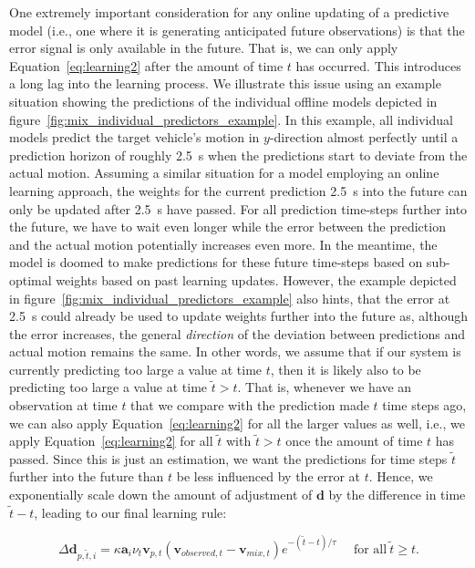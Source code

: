 One extremely important consideration for any online updating of a predictive model (i.e., one where it is generating anticipated future observations) is that the error signal is only available in the future.
That is, we can only apply Equation~\eqref{eq:learning2} after the amount of time $t$ has occurred.  
This introduces a long lag into the learning process.  
We illustrate this issue using an example situation showing the predictions of the individual offline models depicted in figure~\ref{fig:mix_individual_predictors_example}.
In this example, all individual models predict the target vehicle's motion in $y$-direction almost perfectly until a prediction horizon of roughly \SI{2.5}{\second} when the predictions start to deviate from the actual motion.
Assuming a similar situation for a model employing an online learning approach, the weights for the current prediction \SI{2.5}{\second} into the future can only be updated after \SI{2.5}{\second} have passed. 
For all prediction time-steps further into the future, we have to wait even longer while the error between the prediction and the actual motion potentially increases even more.
In the meantime, the model is doomed to make predictions for these future time-steps based on sub-optimal weights based on past learning updates.
However, the example depicted in figure~\ref{fig:mix_individual_predictors_example} also hints, that the error at \SI{2.5}{\second} could already be used to update weights further into the future as, although the error increases, the general \emph{direction} of the deviation between predictions and actual motion remains the same. 
In other words, we assume that if our system is currently predicting too large a value at time $t$, then it is likely also to be predicting too large a value at time $ \tilde{t} > t$.
That is, whenever we have an observation at time $t$ that we compare with the prediction made $t$ time steps ago, we can also apply Equation~\eqref{eq:learning2} for all the larger values as well, i.e., we apply Equation~\eqref{eq:learning2} for all $ \tilde{t}$ with $ \tilde{t} > t$ once the amount of time $t$ has passed.
Since this is just an estimation, we want the predictions for time steps $ \tilde{t} $ further into the future than $t$ be less influenced by the error at $t$.
Hence, we exponentially scale down the amount of adjustment of $\mathbf{d}$ by the difference in time $ \tilde{t}-t$, leading to our final learning rule:

\begin{equation}
    \Delta\mathbf{d}_{p, \tilde{t} ,i} = \kappa \mathbf{a}_i \nu_{t} \mathbf{v}_{p,t} (\mathbf{v}_{observed,t}-\mathbf{v}_{mix,t}) e^{-{( \tilde{t} - t)}/\tau} ~~~~~~ \textrm{for all}~ \tilde{t}  \geq t.
  \label{eq:learning3}
\end{equation}


